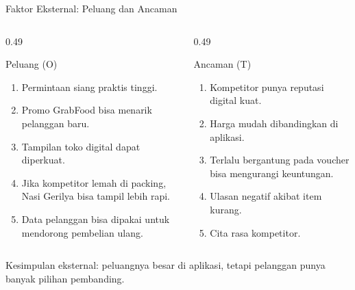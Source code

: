 \documentclass[aspectratio=169,11pt]{beamer}
\begin{document}
\begin{frame}{Faktor Eksternal: Peluang dan Ancaman}
\small
\begin{columns}[T,onlytextwidth]
    \begin{column}{0.49\textwidth}
        \begin{block}{Peluang (O)}
        \begin{enumerate}
            \item Permintaan siang praktis tinggi.
            \item Promo GrabFood bisa menarik pelanggan baru.
            \item Tampilan toko digital dapat diperkuat.
            \item Jika kompetitor lemah di packing, Nasi Gerilya bisa tampil lebih rapi.
            \item Data pelanggan bisa dipakai untuk mendorong pembelian ulang.
        \end{enumerate}
        \end{block}
    \end{column}
    \begin{column}{0.49\textwidth}
        \begin{block}{Ancaman (T)}
        \begin{enumerate}
            \item Kompetitor punya reputasi digital kuat.
            \item Harga mudah dibandingkan di aplikasi.
            \item Terlalu bergantung pada voucher bisa mengurangi keuntungan.
            \item Ulasan negatif akibat item kurang.
            \item Cita rasa kompetitor.
        \end{enumerate}
        \end{block}
    \end{column}
\end{columns}
\vspace{0.15cm}
\alert{Kesimpulan eksternal:} peluangnya besar di aplikasi, tetapi pelanggan punya banyak pilihan pembanding.
\end{frame}
\end{document}
